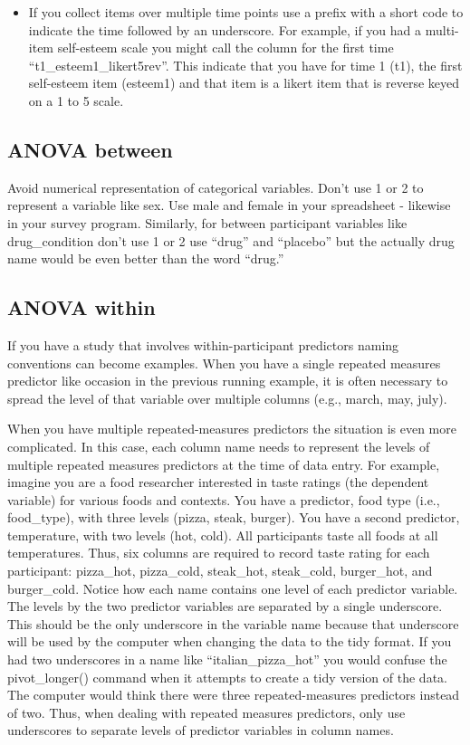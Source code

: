 \documentclass[
]{krantz}
\providecommand{\tightlist}{%
  \setlength{\itemsep}{0pt}\setlength{\parskip}{0pt}}
\begin{document}
\begin{itemize}
\tightlist
\item
  If you collect items over multiple time points use a prefix with a short code to indicate the time followed by an underscore. For example, if you had a multi-item self-esteem scale you might call the column for the first time ``t1\_esteem1\_likert5rev''. This indicate that you have for time 1 (t1), the first self-esteem item (esteem1) and that item is a likert item that is reverse keyed on a 1 to 5 scale.
\end{itemize}

\hypertarget{anova-between}{%
\subsection{ANOVA between}\label{anova-between}}

Avoid numerical representation of categorical variables. Don't use 1 or 2 to represent a variable like sex. Use male and female in your spreadsheet - likewise in your survey program. Similarly, for between participant variables like drug\_condition don't use 1 or 2 use ``drug'' and ``placebo'' but the actually drug name would be even better than the word ``drug.''

\hypertarget{anova-within}{%
\subsection{ANOVA within}\label{anova-within}}

If you have a study that involves within-participant predictors naming conventions can become examples. When you have a single repeated measures predictor like occasion in the previous running example, it is often necessary to spread the level of that variable over multiple columns (e.g., march, may, july).

When you have multiple repeated-measures predictors the situation is even more complicated. In this case, each column name needs to represent the levels of multiple repeated measures predictors at the time of data entry. For example, imagine you are a food researcher interested in taste ratings (the dependent variable) for various foods and contexts. You have a predictor, food type (i.e., food\_type), with three levels (pizza, steak, burger). You have a second predictor, temperature, with two levels (hot, cold). All participants taste all foods at all temperatures. Thus, six columns are required to record taste rating for each participant: pizza\_hot, pizza\_cold, steak\_hot, steak\_cold, burger\_hot, and burger\_cold. Notice how each name contains one level of each predictor variable. The levels by the two predictor variables are separated by a single underscore. This should be the only underscore in the variable name because that underscore will be used by the computer when changing the data to the tidy format. If you had two underscores in a name like ``italian\_pizza\_hot'' you would confuse the pivot\_longer() command when it attempts to create a tidy version of the data. The computer would think there were three repeated-measures predictors instead of two. Thus, when dealing with repeated measures predictors, only use underscores to separate levels of predictor variables in column names.
\end{document}
